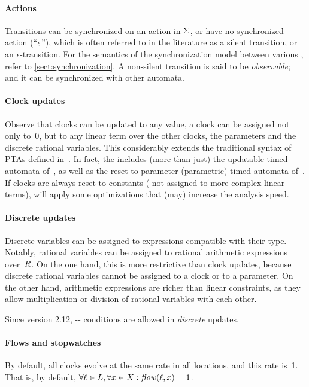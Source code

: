 \paragraph{Actions}
Transitions can be synchronized on an action in $\Sigma$, or have no synchronized action (``$\epsilon$''), which is often referred to in the literature as a silent transition, or an $\epsilon$-transition.
For the semantics of the synchronization model between various \IPTA{}, refer to \cref{sect:synchronization}.
A non-silent transition is said to be \emph{observable}; and it can be synchronized with other automata.

\paragraph{Clock updates}
Observe that clocks can be updated to any value, \ie{} a clock can be assigned not only to~0, but to any linear term over the other clocks, the parameters and the discrete rational variables.
This considerably extends the traditional syntax of PTAs defined in~\cite{AHV93}.
In fact, the \imitator{} includes (more than just) the updatable timed automata of~\cite{BDFP04}, as well as the reset-to-parameter (parametric) timed automata of~\cite{ALR18PresetTA}.
If clocks are always reset to constants (\ie{} not assigned to more complex linear terms), \imitator{} will apply some optimizations that (may) increase the analysis speed.

\paragraph{Discrete updates}
Discrete variables can be assigned to expressions compatible with their type.
Notably, rational variables can be assigned to rational arithmetic expressions over~$R$.
On the one hand, this is more restrictive than clock updates, because discrete rational variables cannot be assigned to a clock or to a parameter.
On the other hand, arithmetic expressions are richer than linear constraints, as they allow multiplication or division of rational variables with each other.

Since version 2.12, -- conditions are allowed in \emph{discrete} updates.

\paragraph{Flows and stopwatches}
By default, all clocks evolve at the same rate in all locations, and this rate is~1.
That is, by default, $\forall \ell \in L, \forall x \in X : \mathit{flow}(\ell, x) = 1$.


